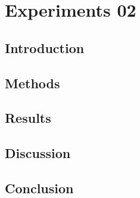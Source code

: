 \chapter{Experiments 02}
\label{chapterlabel}

\blindtext

\section{Introduction}

\section{Methods}

\section{Results}

\section{Discussion}

\section{Conclusion}